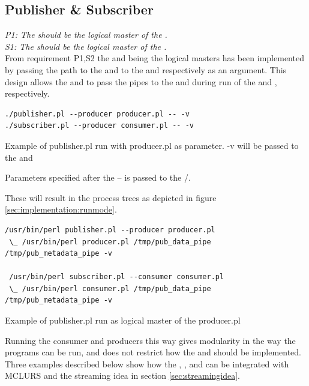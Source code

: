 \subsection{Publisher \& Subscriber}

\textit{P1: The \pub{} should be the logical master of the \pro{}.}\\
\textit{S1: The \sub{} should be the logical master of the \pro{}.}\\

From requirement P1,S2 the \pub{} and \sub{} being the logical masters has been implemented by passing the path to the \con{} and \pro{} to the \sub{} and \pro{} respectively as an argument. This design allows the \pub{} and \sub{} to pass the pipes to the \pro{} and \con{} during run of the \con{} and \pro{}, respectively.

\begin{listing}[H] 
\begin{verbatim}
./publisher.pl --producer producer.pl -- -v
./subscriber.pl --producer consumer.pl -- -v
\end{verbatim}
\caption{Example of publisher.pl run with producer.pl as parameter. -v will be passed to the \con{} and \pro{}}
Parameters specified after the -- is passed to the \con{}/\pro{}.
\label{lst:runcli}
\end{listing}

These will result in the process trees as depicted in figure \ref{sec:implementation:runmode}.

\begin{listing}[H] 
\begin{verbatim}
/usr/bin/perl publisher.pl --producer producer.pl
 \_ /usr/bin/perl producer.pl /tmp/pub_data_pipe /tmp/pub_metadata_pipe -v
 
 /usr/bin/perl subscriber.pl --consumer consumer.pl
 \_ /usr/bin/perl consumer.pl /tmp/pub_data_pipe /tmp/pub_metadata_pipe -v
\end{verbatim}
\caption{Example of publisher.pl run as logical master of the producer.pl}
\label{sec:implementation:runmode}
\end{listing}

Running the consumer and producers this way gives modularity in the way the programs can be run, and does not restrict how the \con{} and \pro{} should be implemented.
Three examples described below show how the \pros{}, \cons{}, \pubs{} and \subs{} can be integrated with MCLURS and the streaming idea in section \ref{sec:streamingidea}.

